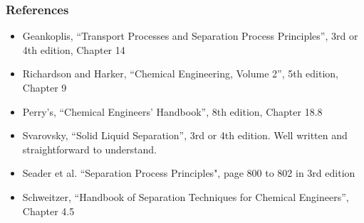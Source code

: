 \begin{frame}\frametitle{References}
	\begin{itemize}
		\item	Geankoplis, ``Transport Processes and Separation Process Principles'', 3rd or 4th edition, Chapter 14
		\item	Richardson and Harker, ``Chemical Engineering, Volume 2'', 5th edition, Chapter 9
		\item	Perry's, ``Chemical Engineers' Handbook'', 8th edition, Chapter 18.8 
		\item	Svarovsky, ``Solid Liquid Separation'', 3rd or 4th edition. Well written and straightforward to understand.
		\item	Seader et al. ``Separation Process Principles", page 800 to 802 in 3rd edition 
		\item	Schweitzer, ``Handbook of Separation Techniques for Chemical Engineers'', Chapter 4.5
	\end{itemize}
\end{frame}
